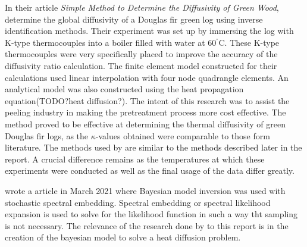 	In their article \textit{Simple Method to Determine the Diffusivity of Green Wood}, \citeauthor{bioresource:2020}  determine the global diffusivity of a Douglas fir green log using inverse identification methods. 
	Their experiment was set up by immersing the log with K-type thermocouples into a boiler filled with water at 60$^{^{\circ}}$C. 
	These K-type thermocouples were very specifically placed to improve the accuracy of the diffusivity ratio calculation.
	The finite element model constructed for their calculations used linear interpolation with four node quadrangle elements.
	An analytical model was also constructed using the heat propagation equation(TODO?heat diffusion?).
	The intent of this research was to assist the peeling industry in making the pretreatment process more cost effective.
	The method proved to be effective at determining the thermal diffusivity of green Douglas fir logs, as the $\kappa$-values obtained were comparable to those form literature.
	The methods used by \citet{bioresource:2020} are similar to the methods described later in the report.
	A crucial difference remains as the temperatures at which these experiments were conducted as well as the final usage of the data differ greatly.


\citeauthor{Wagner:2021} wrote a article in March 2021 where Bayesian model inversion was used with stochastic spectral embedding.
Spectral embedding or spectral likelihood expansion is used to solve for the likelihood function in such a way tht sampling is not necessary.
The relevance of the research done by \citeauthor{Wagner:2021} to this report is in the creation of the bayesian model to solve a heat diffusion problem.

